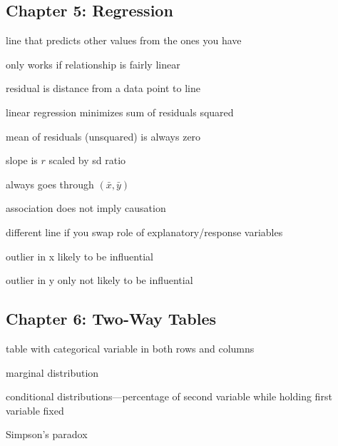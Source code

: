 \documentclass[letterpaper, landscape]{exam}
\begin{document}
  \subsection{Chapter 5: Regression}

  \begin{itemize*}
    \item line that predicts other values from the ones you have
    \item only works if relationship is fairly linear
    \item residual is distance from a data point to line
    \item linear regression minimizes sum of residuals squared
    \item mean of residuals (unsquared) is always zero
    \item slope is $r$ scaled by sd ratio
    \item always goes through $(\bar{x}, \bar{y})$
    \item association does not imply causation
    \item different line if you swap role of explanatory/response variables
    \item outlier in x likely to be influential
    \item outlier in y only not likely to be influential
  \end{itemize*}

  \subsection{Chapter 6: Two-Way Tables}
  \begin{itemize*}
    \item table with categorical variable in both rows and columns
    \item marginal distribution
    \item conditional distributions---percentage of second variable while
      holding first variable fixed
    \item Simpson's paradox
  \end{itemize*}
\end{document}
